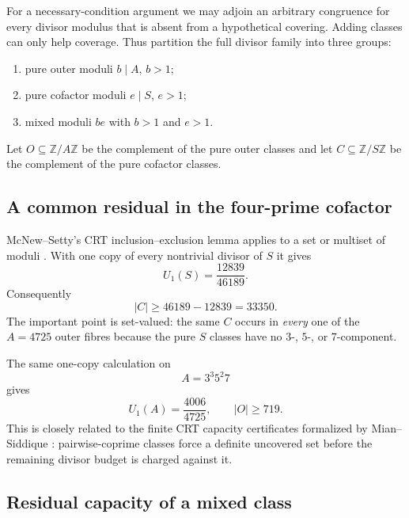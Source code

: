 \documentclass[11pt]{article}
\theoremstyle{definition}
\newcommand{\Z}{\mathbb Z}
\begin{document}
For a necessary-condition argument we may adjoin an arbitrary congruence for every divisor
modulus that is absent from a hypothetical covering.  Adding classes can only help coverage.
Thus partition the full divisor family into three groups:
\begin{enumerate}[label=(\roman*)]
\item pure outer moduli $b\mid A$, $b>1$;
\item pure cofactor moduli $e\mid S$, $e>1$;
\item mixed moduli $be$ with $b>1$ and $e>1$.
\end{enumerate}
Let $O\subseteq\Z/A\Z$ be the complement of the pure outer classes and let
$C\subseteq\Z/S\Z$ be the complement of the pure cofactor classes.

\subsection{A common residual in the four-prime cofactor}

McNew--Setty's CRT inclusion--exclusion lemma applies to a set or multiset of moduli
\cite{McNewSetty2026}.  With one copy of every nontrivial divisor of $S$ it gives
\[
 U_1(S)=\frac{12839}{46189}.
\]
Consequently
\begin{equation}\label{eq:C-lower}
 \boxed{|C|\ge 46189-12839=33350.}
\end{equation}
The important point is set-valued: the same $C$ occurs in \emph{every} one of the $A=4725$
outer fibres because the pure $S$ classes have no $3$-, $5$-, or $7$-component.

The same one-copy calculation on
\[
 A=3^3 5^2 7
\]
gives
\begin{equation}\label{eq:O-lower}
 U_1(A)=\frac{4006}{4725},
 \qquad
 \boxed{|O|\ge719.}
\end{equation}
This is closely related to the finite CRT capacity certificates formalized by
Mian--Siddique \cite{MianSiddique2026}: pairwise-coprime classes force a definite uncovered
set before the remaining divisor budget is charged against it.

\subsection{Residual capacity of a mixed class}
\end{document}
